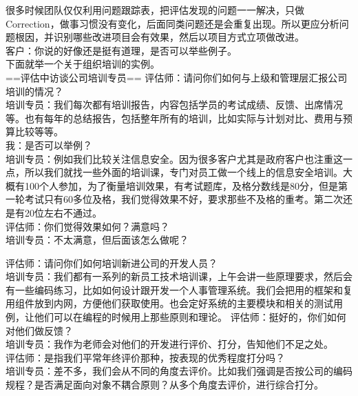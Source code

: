 很多时候团队仅仅利用问题跟踪表，把评估发现的问题一一解决，只做Correction，做事习惯没有变化，后面同类问题还是会重复出现。所以更应分析问题根因，并识别哪些改进项目会有效果，然后以项目方式立项做改进。\\
客户：你说的好像还是挺有道理，是否可以举些例子。\\
下面就举一个关于组织培训的实例。\\
==评估中访谈公司培训专员==
评估师：请问你们如何与上级和管理层汇报公司培训的情况？\\
培训专员：我们每次都有培训报告，内容包括学员的考试成绩、反馈、出席情况等。也有每年的总结报告，包括整年所有的培训，比如实际与计划对比、费用与预算比较等等。\\
我：是否可以举例？\\

培训专员：例如我们比较关注信息安全。因为很多客户尤其是政府客户也注重这一点，所以我们就找一些外面的培训课，专门对员工做一个线上的信息安全培训。大概有100个人参加，为了衡量培训效果，有考试题库，及格分数线是80分，但是第一轮考试只有60多位及格，我们觉得效果不好，要求那些不及格的重考。第二次还是有20位左右不通过。\\

评估师：你们觉得效果如何？满意吗？\\

培训专员：不太满意，但后面该怎么做呢？

\begin{description}
\item[]
\end{description}

评估师：请问你们如何培训新进公司的开发人员？\\
培训专员：我们都有一系列的新员工技术培训课，上午会讲一些原理要求，然后会有一些编码练习，比如如何设计跟开发一个人事管理系统。我们会把用的框架和复用组件放到内网，方便他们获取使用。也会定好系统的主要模块和相关的测试用例，让他们可以在编程的时候用上那些原则和理论。
评估师：挺好的，你们如何对他们做反馈？\\
培训专员：我作为老师会对他们的开发进行评价、打分，告知他们不足之处。\\
评估师：是指我们平常年终评价那种，按表现的优秀程度打分吗？\\
培训专员：差不多，我们会从不同的角度去评价。比如我们强调是否按公司的编码规程？是否满足面向对象不耦合原则？从多个角度去评价，进行综合打分。\\

